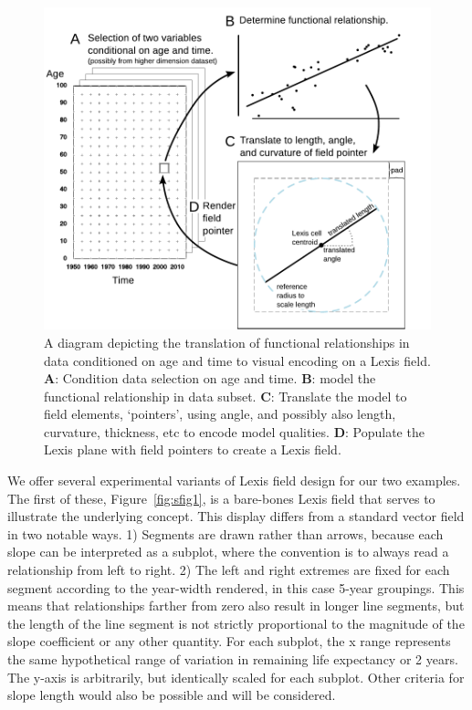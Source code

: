 \documentclass{article}
\begin{document}
\begin{figure}[ht!]
  \centering
  \includegraphics[scale=.8]{Figures/ExplainerDiagram.pdf}
  \caption{A diagram depicting the translation of functional relationships in data conditioned on age and time to visual encoding on a Lexis field. \textbf{A}: Condition data selection on age and time. \textbf{B}: model the functional relationship in data subset. \textbf{C}: Translate the model to field elements, `pointers', using angle, and possibly also length, curvature, thickness, etc to encode model qualities. \textbf{D}: Populate the Lexis plane with field pointers to create a Lexis field.}
  \label{fig:explain}
\end{figure}

We offer several experimental variants of Lexis field design for our two
examples. The first of these, Figure~\ref{fig:sfig1}, is a bare-bones Lexis field that serves to illustrate the underlying concept. This display differs from a standard vector field in two notable ways. 1) Segments are drawn rather than arrows, because each slope can be
interpreted as a subplot, where the convention is to always read a
relationship from left to right. 2) The left and right extremes are fixed for
each segment according to the year-width rendered, in this case 5-year
groupings. This means that relationships farther from zero also result in longer
line segments, but the length of the line segment is not strictly proportional
to the magnitude of the slope coefficient or any other quantity. For each
subplot, the x range represents the same hypothetical range of
variation in remaining life expectancy or 2 years. The y-axis is arbitrarily,
but identically scaled for each subplot. Other criteria for slope length would
also be possible and will be considered.
\end{document}
